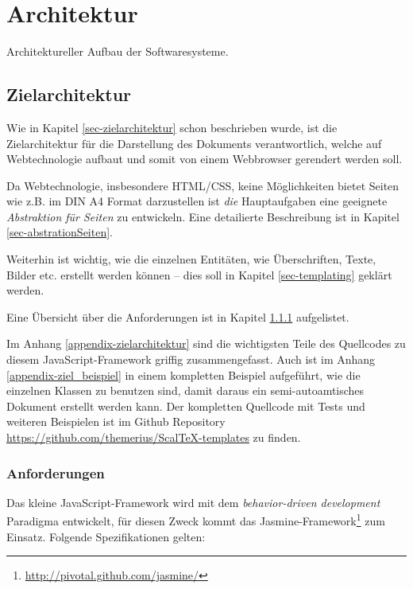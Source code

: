 \chapter{Architektur}\label{ch-architektur}

Architektureller Aufbau der Softwaresysteme.

\section{Zielarchitektur}

Wie in Kapitel \ref{sec-zielarchitektur} schon beschrieben wurde, ist die
Zielarchitektur für die Darstellung des Dokuments verantwortlich, welche
auf Webtechnologie aufbaut und somit von einem Webbrowser gerendert werden
soll.

Da Webtechnologie, insbesondere HTML/CSS, keine Möglichkeiten bietet
Seiten wie z.B. im DIN A4 Format darzustellen ist \emph{die}
Hauptaufgaben eine geeignete \emph{Abstraktion für Seiten} zu entwickeln.
Eine detailierte Beschreibung ist in Kapitel \ref{sec-abstrationSeiten}.

Weiterhin ist wichtig, wie die einzelnen Entitäten, wie Überschriften,
Texte, Bilder etc. erstellt werden können -- dies soll in Kapitel
\ref{sec-templating} geklärt werden.

Eine Übersicht über die Anforderungen ist in Kapitel
\ref{sec-ziel_anforderungen} aufgelistet.

Im Anhang \ref{appendix-zielarchitektur} sind die wichtigsten Teile des
Quellcodes zu diesem JavaScript-Framework griffig zusammengefasst.
Auch ist im Anhang \ref{appendix-ziel_beispiel} in einem kompletten
Beispiel aufgeführt, wie die einzelnen Klassen zu benutzen sind,
damit daraus ein semi-autoamtisches Dokument erstellt werden kann.
Der kompletten Quellcode mit Tests und weiteren Beispielen ist im
Github Repository \url{https://github.com/themerius/ScalTeX-templates}
zu finden.

\subsection{Anforderungen}\label{sec-ziel_anforderungen}

Das kleine JavaScript-Framework wird mit dem
\emph{behavior-driven development} Paradigma entwickelt,
für diesen Zweck kommt das
Jasmine-Framework\footnote{\url{http://pivotal.github.com/jasmine/}}
zum Einsatz. Folgende Spezifikationen gelten:

